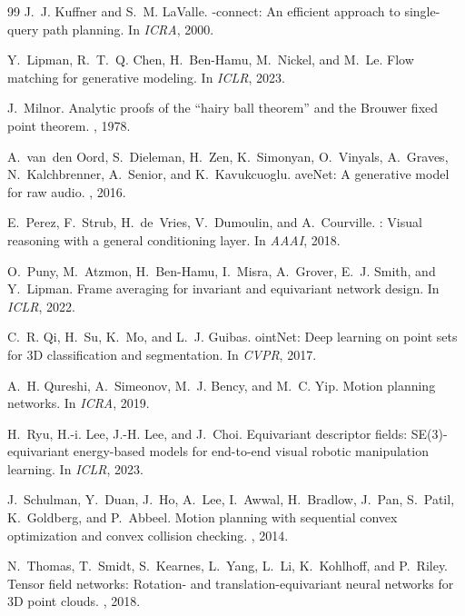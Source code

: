 \documentclass[conference]{IEEEtran}
\begin{document}
\begin{thebibliography}{99}
J.~J. Kuffner and S.~M. LaValle.
-connect: An efficient approach to single-query path planning.
\newblock In {\em ICRA}, 2000.

Y.~Lipman, R.~T.~Q. Chen, H.~Ben-Hamu, M.~Nickel, and M.~Le.
\newblock Flow matching for generative modeling.
\newblock In {\em ICLR}, 2023.

J.~Milnor.
\newblock Analytic proofs of the ``hairy ball theorem'' and the {B}rouwer fixed
  point theorem.
, 1978.

A.~van~den Oord, S.~Dieleman, H.~Zen, K.~Simonyan, O.~Vinyals, A.~Graves,
  N.~Kalchbrenner, A.~Senior, and K.~Kavukcuoglu.
ave{N}et: A generative model for raw audio.
, 2016.

E.~Perez, F.~Strub, H.~de~Vries, V.~Dumoulin, and A.~Courville.
: Visual reasoning with a general conditioning layer.
\newblock In {\em AAAI}, 2018.

O.~Puny, M.~Atzmon, H.~Ben-Hamu, I.~Misra, A.~Grover, E.~J. Smith, and
  Y.~Lipman.
\newblock Frame averaging for invariant and equivariant network design.
\newblock In {\em ICLR}, 2022.

C.~R. Qi, H.~Su, K.~Mo, and L.~J. Guibas.
oint{N}et: Deep learning on point sets for 3{D} classification and
  segmentation.
\newblock In {\em CVPR}, 2017.

A.~H. Qureshi, A.~Simeonov, M.~J. Bency, and M.~C. Yip.
\newblock Motion planning networks.
\newblock In {\em ICRA}, 2019.

H.~Ryu, H.-i. Lee, J.-H. Lee, and J.~Choi.
\newblock Equivariant descriptor fields: {SE(3)}-equivariant energy-based models
  for end-to-end visual robotic manipulation learning.
\newblock In {\em ICLR}, 2023.

J.~Schulman, Y.~Duan, J.~Ho, A.~Lee, I.~Awwal, H.~Bradlow, J.~Pan, S.~Patil,
  K.~Goldberg, and P.~Abbeel.
\newblock Motion planning with sequential convex optimization and convex
  collision checking.
, 2014.

N.~Thomas, T.~Smidt, S.~Kearnes, L.~Yang, L.~Li, K.~Kohlhoff, and P.~Riley.
\newblock Tensor field networks: Rotation- and translation-equivariant neural
  networks for 3{D} point clouds.
, 2018.


\end{thebibliography}
\end{document}
